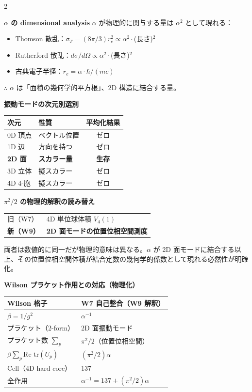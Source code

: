 \documentclass[9pt,a4paper]{ltjsarticle}
\begin{document}
\begin{multicols}{2}
\small

\textbf{$\alpha$ の dimensional analysis}\enspace
$\alpha$ が物理的に関与する量は $\alpha^2$ として現れる：
\begin{itemize}[topsep=1pt]
\item Thomson 散乱：$\sigma_T = (8\pi/3) r_e^2 \propto \alpha^2 \cdot$(長さ)$^2$
\item Rutherford 散乱：$d\sigma/d\Omega \propto \alpha^2 \cdot$(長さ)$^2$
\item 古典電子半径：$r_e = \alpha \cdot \hbar/(mc)$
\end{itemize}
$\therefore$ $\alpha$ は「面積の幾何学的平方根」、2D 構造に結合する量。

\smallskip
\textbf{振動モードの次元別選別}\enspace

\vspace{1pt}
{\footnotesize
\begin{tabular}{@{}llc@{}}
\toprule
次元 & 性質 & 平均化結果 \\
\midrule
0D 頂点 & ベクトル位置 & ゼロ \\
1D 辺 & 方向を持つ & ゼロ \\
\textbf{2D 面} & \textbf{スカラー量} & \textbf{生存} \\
3D 立体 & 擬スカラー & ゼロ \\
4D 4-胞 & 擬スカラー & ゼロ \\
\bottomrule
\end{tabular}
}

\smallskip
\textbf{$\pi^2/2$ の物理的解釈の読み替え}

\vspace{1pt}
{\footnotesize
\begin{tabular}{@{}ll@{}}
\toprule
旧（W7） & 4D 単位球体積 $V_4(1)$ \\
\textbf{新（W9）} & \textbf{2D 面モードの位置位相空間測度} \\
\bottomrule
\end{tabular}
}

\smallskip
両者は数値的に同一だが物理的意味は異なる。$\alpha$ が 2D 面モードに結合する以上、その位置位相空間体積が結合定数の幾何学的係数として現れる必然性が明確化。

\columnbreak

\textbf{Wilson プラケット作用との対応（物理化）}

\vspace{1pt}
{\footnotesize
\begin{tabular}{@{}ll@{}}
\toprule
Wilson 格子 & W7 自己整合（W9 解釈） \\
\midrule
$\beta = 1/g^2$ & $\alpha^{-1}$ \\
プラケット（2-form） & 2D 面振動モード \\
プラケット数 $\sum_p$ & $\pi^2/2$（位置位相空間） \\
$\beta \sum_p \text{Re tr}(U_p)$ & $(\pi^2/2)\alpha$ \\
Cell（4D hard core） & 137 \\
全作用 & $\alpha^{-1} = 137 + (\pi^2/2)\alpha$ \\
\bottomrule
\end{tabular}
}


\end{multicols}
\end{document}
